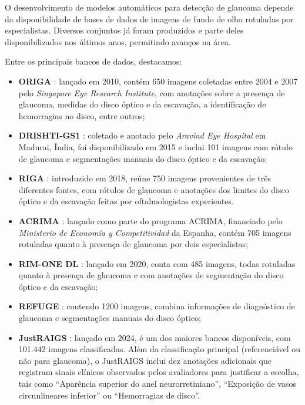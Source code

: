 \documentclass[12pt]{article}
\begin{document}
O desenvolvimento de modelos automáticos para detecção de glaucoma depende da disponibilidade de bases de dados de imagens de fundo de olho rotuladas por especialistas. Diversos conjuntos já foram produzidos e parte deles disponibilizados nos últimos anos, permitindo avanços na área.

Entre os principais bancos de dados, destacamos:

\begin{itemize}
    \item \textbf{ORIGA} \cite{origa}: lançado em 2010, contém 650 imagens coletadas entre 2004 e 2007 pelo \textit{Singapore Eye Research Institute}, com anotações sobre a presença de glaucoma, medidas do disco óptico e da escavação, a identificação de hemorragias no disco, entre outros;
    \item \textbf{DRISHTI-GS1} \cite{drishti_1} \cite{drishti_2}: coletado e anotado pelo \textit{Aravind Eye Hospital} em Madurai, Índia, foi disponibilizado em 2015 e inclui 101 imagens com rótulo de glaucoma e segmentações manuais do disco óptico e da escavação;
    \item \textbf{RIGA} \cite{riga}: introduzido em 2018, reúne 750 imagens provenientes de três diferentes fontes, com rótulos de glaucoma e anotações dos limites do disco óptico e da escavação feitas por oftalmologistas experientes.
    \item \textbf{ACRIMA} \cite{diaz-pinto2019cnns}: lançado como parte do programa ACRIMA, financiado pelo \textit{Ministerio de Economía y Competitividad} da Espanha, contém 705 imagens rotuladas quanto à presença de glaucoma por dois especialistas;
    \item \textbf{RIM-ONE DL} \cite{rim-one-dl}: lançado em 2020, conta com 485 imagens, todas rotuladas quanto à presença de glaucoma e com anotações de segmentação do disco óptico e da escavação;
    \item \textbf{REFUGE} \cite{refuge}: contendo 1200 imagens, combina informações de diagnóstico de glaucoma e segmentações manuais do disco óptico;
    \item \textbf{JustRAIGS} \cite{justraigs}: lançado em 2024, é um dos maiores bancos disponíveis, com 101.442 imagens classificadas. Além da classificação principal (referenciável ou não para glaucoma), o JustRAIGS inclui dez anotações adicionais que registram sinais clínicos observados pelos avaliadores para justificar a escolha, tais como ``Aparência superior do anel neurorretiniano'', ``Exposição de vasos circunlineares inferior'' ou ``Hemorragias de disco''.
\end{itemize}
\end{document}
